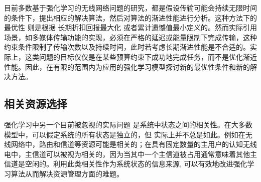 \documentclass{IEEEtran}
\begin{document}
目前多数基于强化学习的无线网络问题的研究，都是假设传输可能会持续无限时间的条件下，提出相应的解决算法，然后对算法的渐进性能进行分析。这种方法下的最优性 则是根据 长期折扣回报最大化 或者累计遗憾值最小定义的。然而实际引用场景，如多媒体传输功能的实现，必须在严格的延迟或能量限制下完成传输，这种约束条件限制了传输次数以及持续时间，此时若考虑长期渐进性能是不合适的。实际上，这类问题的目标仅仅是在某些预算约束下成功地完成任务，而不是优化渐近性能。因此，在有限的范围内为应用的强化学习模型探讨新的最优性条件和新的解决方法。


\subsection{相关资源选择}
强化学习中另一个目前被忽视的实际问题 是系统中状态之间的相关性。在大多数模型中，可以假定系统的所有状态是独立的，但 实际上并不总是如此。例如在无线网络中，路由和信道等资源可能是相关的；在具有固定数量的主用户的认知无线电中，主信道可以被视为相关的，因为当其中一个主信道被占用通常意味着其他主信道是空闲的。利用此类相关性作为系统状态的信息来源, 可以有效地改进强化学习算法从而解决资源管理方面的难题。

%
%
\end{document}
